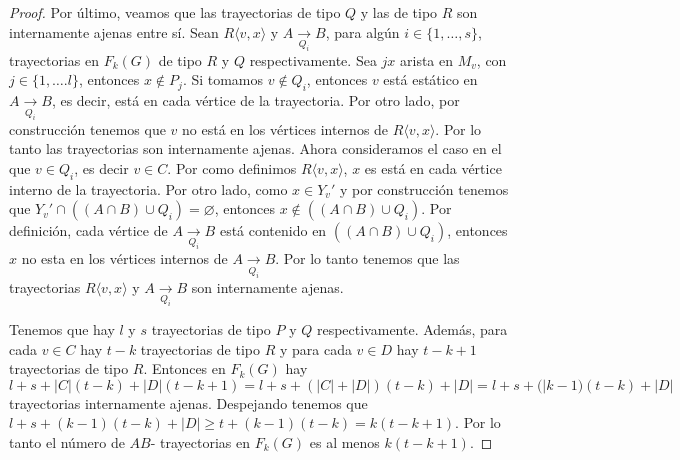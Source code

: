 \begin{proof}
    Por \'ultimo, veamos que las trayectorias de tipo $Q$ y las de tipo $R$ son
    internamente ajenas entre s\'i{}. Sean $R\langle v,x \rangle$ y $A
    \xrightarrow[Q_i]{}  B$, para alg\'un $i \in \{1, \dots, s\}$, trayectorias
    en $F_k(G)$ de tipo $R$ y $Q$ respectivamente. Sea $jx$ arista en $M_v$, con
    $j \in \{1, \dots. l\}$, entonces $x \notin P_j$. Si tomamos $v \notin Q_i$,
    entonces $v$ est\'a est\'atico en $A \xrightarrow[Q_i]{} B$, es decir,
    est\'a en cada v\'ertice de la trayectoria. Por otro lado, por
    construcci\'on tenemos que $v$ no est\'a en los v\'ertices internos de $R
    \langle v, x \rangle$. Por lo tanto las trayectorias son internamente
    ajenas. Ahora consideramos el caso en el que $v \in Q_i$, es decir $v \in
    C$. Por como definimos $R \langle v,x \rangle$, $x$ es est\'a en cada
    v\'ertice interno de la trayectoria. Por otro lado, como $x \in Y_v'$ y por
    construcci\'on tenemos que $Y_v ' \cap ((A\cap B) \cup Q_i) = \varnothing$,
    entonces $x \notin ((A \cap B) \cup Q_i)$. Por definici\'on, cada v\'ertice
    de $A \xrightarrow[Q_i]{}  B$ est\'a contenido en $((A \cap B) \cup Q_i)$,
    entonces $x$ no esta en los v\'ertices internos de $A \xrightarrow[Q_i]{}
    B$. Por lo tanto tenemos que las trayectorias $R\langle v,x \rangle$ y $A
    \xrightarrow[Q_i]{}  B$ son internamente ajenas.

    Tenemos que hay $l$ y $s$ trayectorias de tipo $P$ y $Q$ respectivamente.
    Adem\'as, para cada $v \in C$ hay $t-k$ trayectorias de tipo $R$ y para cada
    $v \in D$ hay $t-k+1$ trayectorias de tipo $R$. Entonces en $F_k(G)$ hay $l+
    s+ |C|(t-k)+ |D|(t-k +1) = l + s + (|C| + |D|)(t-k) + |D| = l + s +
    (|k-1)(t-k) + |D|$ trayectorias internamente ajenas. Despejando tenemos que
    $l + s + (k-1)(t-k) + |D| \geq t+ (k-1)(t-k) = k (t -k +1)$. Por lo tanto el
    n\'umero de $AB$- trayectorias en $F_k(G)$ es al menos $k(t-k+1)$.
\end {proof}


